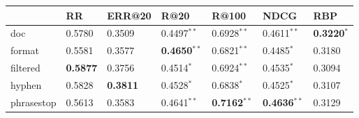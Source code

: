 \begin{tabular}{lllllll}
\toprule
{} &               RR &           ERR@20 &                    R@20 &                   R@100 &                    NDCG &                    RBP \\
\midrule
doc        &           0.5780 &           0.3509 &           0.4497$^{**}$ &           0.6928$^{**}$ &           0.4611$^{**}$ &  \textbf{0.3220}$^{*}$ \\
format     &           0.5581 &           0.3577 &  \textbf{0.4650}$^{**}$ &           0.6821$^{**}$ &            0.4485$^{*}$ &                 0.3180 \\
filtered   &  \textbf{0.5877} &           0.3756 &            0.4514$^{*}$ &           0.6924$^{**}$ &            0.4535$^{*}$ &                 0.3094 \\
hyphen     &           0.5828 &  \textbf{0.3811} &            0.4528$^{*}$ &            0.6838$^{*}$ &            0.4525$^{*}$ &                 0.3107 \\
phrasestop &           0.5613 &           0.3583 &           0.4641$^{**}$ &  \textbf{0.7162}$^{**}$ &  \textbf{0.4636}$^{**}$ &                 0.3129 \\
\bottomrule
\end{tabular}
